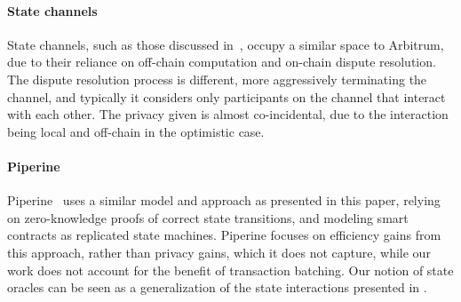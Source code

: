 \paragraph{State channels}

State channels, such as those discussed in~\cite{CCS:DziFauHos18}, occupy a
similar space to Arbitrum, due to their reliance on off-chain computation and
on-chain dispute resolution. The dispute resolution process is different, more
aggressively terminating the channel, and typically it considers only
participants on the channel that interact with each other. The privacy given is
almost co-incidental, due to the interaction being local and off-chain in the
optimistic case.

\paragraph{Piperine}

Piperine~\cite{piperine} uses a similar model and approach as presented in this
paper, relying on zero-knowledge proofs of correct state transitions, and
modeling smart contracts as replicated state machines. Piperine focuses on
efficiency gains from this approach, rather than privacy gains, which it does
not capture, while our work does not account for the benefit of transaction
batching. Our notion of state oracles can be seen as a generalization of the
state interactions presented in \cite{piperine}.

